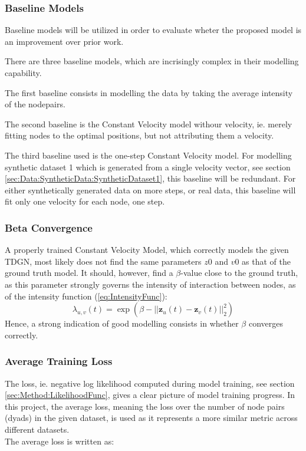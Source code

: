 \subsubsection{Baseline Models}
\label{sec:Method:Evaluation:BaselineModels}
Baseline models will be utilized in order to evaluate wheter the proposed model is an improvement over prior work.

There are three baseline models, which are incrisingly complex in their modelling capability.

The first baseline consists in modelling the data by taking the average intensity of the nodepairs.

The second baseline is the Constant Velocity model withour velocity, ie. merely fitting nodes to the optimal positions, but not attributing them a velocity.

The third baseline used is the one-step Constant Velocity model.
For modelling synthetic dataset 1 which is generated from a single velocity vector, see section \ref{sec:Data:SyntheticData:SyntheticDataset1}, this baseline will be redundant.
For either synthetically generated data on more steps, or real data, this baseline will fit only one velocity for each node, one step.


\subsubsection{Beta Convergence}
\label{sec:Method:Evaluation:BetaConvergence}
A properly trained Constant Velocity Model, which correctly models the given TDGN, most likely does not find the same parameters $z0$ and $v0$ as that of the ground truth model.
It should, however, find a $\beta$-value close to the ground truth, as this parameter strongly governs the intensity of interaction between nodes, as of the intensity function (\ref{eq:IntensityFunc}):
\begin{equation*}
    \lambda_{u,v}(t)
    =
    \exp \left(\beta - ||\textbf{z}_u(t) - \textbf{z}_v(t)||_2^2\right)
\end{equation*}
Hence, a strong indication of good modelling consists in whether $\beta$ converges correctly.


\subsubsection{Average Training Loss}
\label{sec:Method:Evaluation:Loss}
The loss, ie. negative log likelihood computed during model training, see section \ref{sec:Method:LikelihoodFunc}, gives a clear picture of model training progress.
In this project, the average loss, meaning the loss over the number of node pairs (dyads) in the given dataset, is used as it represents a more similar metric across different datasets.
\\
The average loss is written as:

